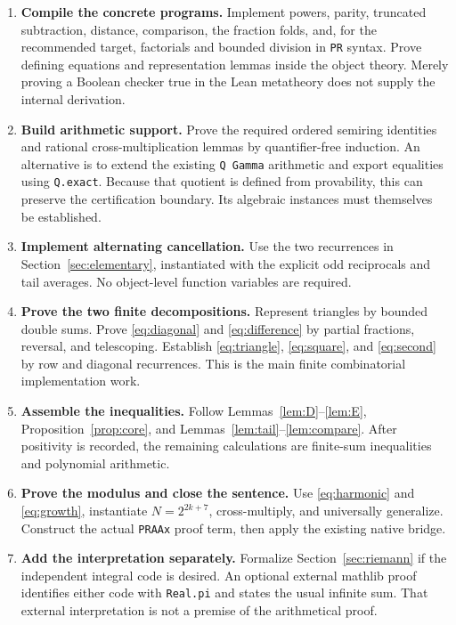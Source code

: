 \documentclass[11pt,a4paper]{article}
\theoremstyle{remark}\newtheorem{remark}[theorem]{Remark}
\begin{document}
\begin{enumerate}[label=\textbf{\arabic*.},leftmargin=*]
\item \textbf{Compile the concrete programs.}
Implement powers, parity, truncated subtraction, distance,
comparison, the fraction folds, and, for the recommended target,
factorials and bounded division in \texttt{PR} syntax.
Prove defining equations and representation lemmas inside the
object theory. Merely proving a Boolean checker true in the Lean
metatheory does not supply the internal derivation.

\item \textbf{Build arithmetic support.}
Prove the required ordered semiring identities and rational
cross-multiplication lemmas by quantifier-free induction.
An alternative is to extend the existing \texttt{Q Gamma}
arithmetic and export equalities using \texttt{Q.exact}.
Because that quotient is defined from provability, this can preserve
the certification boundary. Its algebraic instances must themselves
be established.

\item \textbf{Implement alternating cancellation.}
Use the two recurrences in Section~\ref{sec:elementary}, instantiated
with the explicit odd reciprocals and tail averages. No object-level
function variables are required.

\item \textbf{Prove the two finite decompositions.}
Represent triangles by bounded double sums. Prove
\eqref{eq:diagonal} and \eqref{eq:difference} by partial fractions,
reversal, and telescoping. Establish \eqref{eq:triangle},
\eqref{eq:square}, and \eqref{eq:second} by row and diagonal
recurrences. This is the main finite combinatorial implementation
work.

\item \textbf{Assemble the inequalities.}
Follow Lemmas~\ref{lem:D}--\ref{lem:E},
Proposition~\ref{prop:core}, and
Lemmas~\ref{lem:tail}--\ref{lem:compare}.
After positivity is recorded, the remaining calculations are
finite-sum inequalities and polynomial arithmetic.

\item \textbf{Prove the modulus and close the sentence.}
Use \eqref{eq:harmonic} and \eqref{eq:growth}, instantiate
$N=2^{2k+7}$, cross-multiply, and universally generalize.
Construct the actual \texttt{PRAAx} proof term, then apply the
existing native bridge.

\item \textbf{Add the interpretation separately.}
Formalize Section~\ref{sec:riemann} if the independent integral
code is desired. An optional external mathlib proof identifies
either code with \texttt{Real.pi} and states the usual infinite
sum. That external interpretation is not a premise of the
arithmetical proof.
\end{enumerate}
\end{document}

